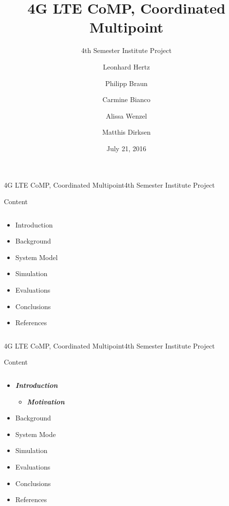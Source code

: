 \documentclass[xcolor={cmyk}]{beamer}
\title{4G LTE CoMP, Coordinated Multipoint}
\subtitle{4th Semester Institute Project}
\author[Matthis Dirksen]{\tiny Leonhard Hertz \and Philipp Braun \and Carmine Bianco \and Alissa Wenzel \and Matthis Dirksen}
\date{July 21, 2016}
\begin{document}
\frame[plain]{\titlepage}

\begin{comment}
 
 \begin{frame}{4G LTE CoMP, Coordinated Multipoint}{4th Semester Institute Project}
	 \begin{block}{...}
	
	 \end{block}
 \end{frame}
 
 \end{comment}

\begin{frame}{4G LTE CoMP, Coordinated Multipoint}{4th Semester Institute Project}
	\begin{block}{Content}
		\begin{columns}
			\begin{column}{.9\textwidth}
				\begin{itemize}
					\item Introduction
					\item Background
					\item System Model
					\item Simulation
					\item Evaluations
					\item Conclusions
					\item References
				\end{itemize}
			\end{column}
		\end{columns}
	\end{block}
\end{frame}

\begin{frame}{4G LTE CoMP, Coordinated Multipoint}{4th Semester Institute Project}
	\begin{block}{Content}
		\begin{columns}
			\begin{column}{.9\textwidth}
				\begin{itemize}
					\item \textbf{\emph{Introduction}}
					\begin{itemize}
						\item \textbf{\emph{Motivation}}
					\end{itemize}
					\item Background
					\item System Mode
					\item Simulation
					\item Evaluations
					\item Conclusions
					\item References
				\end{itemize}
			\end{column}
		\end{columns}
	\end{block}
\end{frame}
\end{document}
